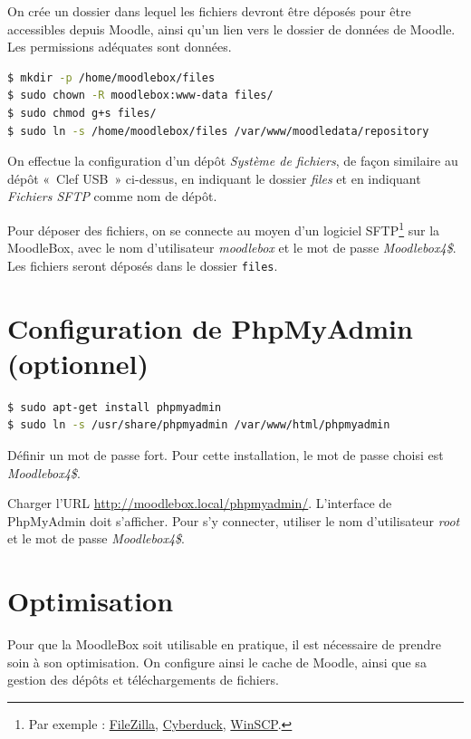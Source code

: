 \documentclass[11pt]{article}
\begin{document}
On crée un dossier dans lequel les fichiers devront être déposés pour être accessibles depuis Moodle, ainsi qu'un lien vers le dossier de données de Moodle. Les permissions adéquates sont données.

\begin{lstlisting}[language=bash]
$ mkdir -p /home/moodlebox/files
$ sudo chown -R moodlebox:www-data files/
$ sudo chmod g+s files/
$ sudo ln -s /home/moodlebox/files /var/www/moodledata/repository
\end{lstlisting}

On effectue la configuration d'un dépôt \emph{Système de fichiers}, de façon similaire au dépôt « Clef USB » ci-dessus, en indiquant le dossier \emph{files} et en indiquant \emph{Fichiers SFTP} comme nom de dépôt.

Pour déposer des fichiers, on se connecte au moyen d'un logiciel SFTP\footnote{Par exemple : \href{https://filezilla-project.org/}{FileZilla}, \href{https://cyberduck.io/}{Cyberduck}, \href{http://winscp.net/}{WinSCP}.} sur la MoodleBox, avec le nom d'utilisateur \emph{moodlebox} et le mot de passe \emph{Moodlebox4\$}. Les fichiers seront déposés dans le dossier \lstinline{files}.

\section{Configuration de PhpMyAdmin (optionnel)}

\begin{lstlisting}[language=bash]
$ sudo apt-get install phpmyadmin
$ sudo ln -s /usr/share/phpmyadmin /var/www/html/phpmyadmin
\end{lstlisting}
Définir un mot de passe fort. Pour cette installation, le mot de passe choisi est \emph{Moodlebox4\$}.

\begin{verification}
Charger l'URL \url{http://moodlebox.local/phpmyadmin/}. L'interface de PhpMyAdmin doit s'afficher. Pour s'y connecter, utiliser le nom d'utilisateur \emph{root} et le mot de passe \emph{Moodlebox4\$}.
\end{verification}

\section{Optimisation}

Pour que la MoodleBox soit utilisable en pratique, il est nécessaire de prendre soin à son optimisation. On configure ainsi le cache de Moodle, ainsi que sa gestion des dépôts et téléchargements de fichiers.
\end{document}
